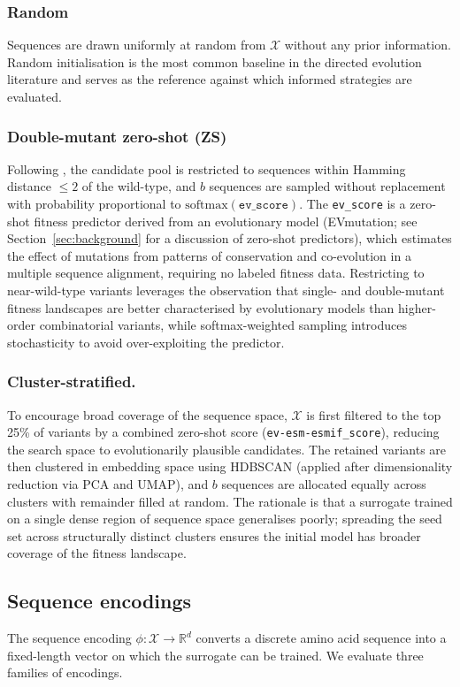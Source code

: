 \subsubsection{Random}
Sequences are drawn uniformly at random from $\mathcal{X}$ without any prior information.
Random initialisation is the most common baseline in the directed evolution literature  and serves as the reference against which informed strategies are evaluated.

\subsubsection{Double-mutant zero-shot (ZS)}
Following \cite{li2024active}, the candidate pool is restricted to sequences within Hamming distance $\leq 2$ of the wild-type, and $b$ sequences are sampled without replacement with probability proportional to $\mathrm{softmax}(\texttt{ev\_score})$.
The \texttt{ev\_score} is a zero-shot fitness predictor derived from an evolutionary model (EVmutation; see Section~\ref{sec:background} for a discussion of zero-shot predictors), which estimates the effect of mutations from patterns of conservation and co-evolution in a multiple sequence alignment, requiring no labeled fitness data.
Restricting to near-wild-type variants leverages the observation that single- and double-mutant fitness landscapes are better characterised by evolutionary models than higher-order combinatorial variants, while softmax-weighted sampling introduces stochasticity to avoid over-exploiting the predictor.

\subsubsection{Cluster-stratified.}
To encourage broad coverage of the sequence space, $\mathcal{X}$ is first filtered to the top 25\% of variants by a combined zero-shot score (\texttt{ev-esm-esmif\_score}), reducing the search space to evolutionarily plausible candidates.
The retained variants are then clustered in embedding space using HDBSCAN (applied after dimensionality reduction via PCA and UMAP), and $b$ sequences are allocated equally across clusters with remainder filled at random.
The rationale is that a surrogate trained on a single dense region of sequence space generalises poorly; spreading the seed set across structurally distinct clusters ensures the initial model has broader coverage of the fitness landscape.

\subsection{Sequence encodings}
The sequence encoding $\phi : \mathcal{X} \to \mathbb{R}^d$ converts a discrete amino acid sequence into a fixed-length vector on which the surrogate can be trained.
We evaluate three families of encodings.

